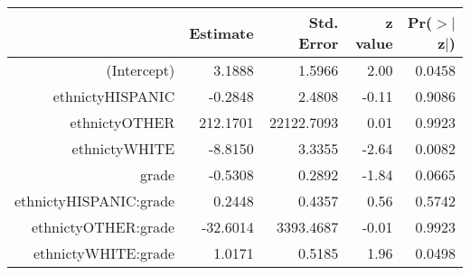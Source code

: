 \begin{tabular}{rrrrr}
  \hline
 & Estimate & Std. Error & z value & Pr($>$$|$z$|$) \\ 
  \hline
(Intercept) & 3.1888 & 1.5966 & 2.00 & 0.0458 \\ 
  ethnictyHISPANIC & -0.2848 & 2.4808 & -0.11 & 0.9086 \\ 
  ethnictyOTHER & 212.1701 & 22122.7093 & 0.01 & 0.9923 \\ 
  ethnictyWHITE & -8.8150 & 3.3355 & -2.64 & 0.0082 \\ 
  grade & -0.5308 & 0.2892 & -1.84 & 0.0665 \\ 
  ethnictyHISPANIC:grade & 0.2448 & 0.4357 & 0.56 & 0.5742 \\ 
  ethnictyOTHER:grade & -32.6014 & 3393.4687 & -0.01 & 0.9923 \\ 
  ethnictyWHITE:grade & 1.0171 & 0.5185 & 1.96 & 0.0498 \\ 
   \hline
\end{tabular}
